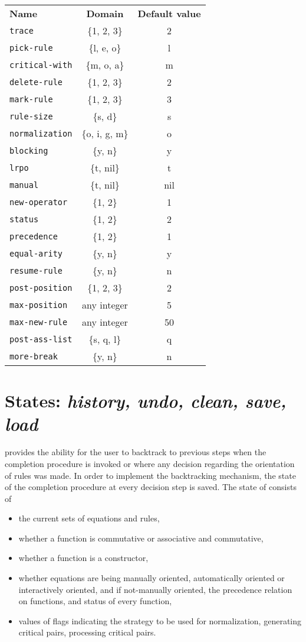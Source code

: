 \begin{tabular}{lcc}
{\bf Name} & {\bf Domain} & {\bf Default value} \\
{\tt trace} & \{1, 2, 3\} & 2 \\
{\tt pick-rule} & \{l, e, o\} & l \\
{\tt critical-with} & \{m, o, a\} & m \\
{\tt delete-rule} & \{1, 2, 3\} & 2 \\
{\tt mark-rule} & \{1, 2, 3\} & 3 \\
{\tt rule-size} & \{s, d\} & s \\
{\tt normalization} & \{o, i, g, m\} & o \\
{\tt blocking} & \{y, n\} & y \\
{\tt lrpo} & \{t, nil\} & t \\
{\tt manual} & \{t, nil\} & nil \\
{\tt new-operator} & \{1, 2\} & 1 \\
{\tt status} & \{1, 2\} & 2 \\
{\tt precedence} & \{1, 2\} & 1 \\
{\tt equal-arity} & \{y, n\} & y \\
{\tt resume-rule} & \{y, n\} & n \\
{\tt post-position} & \{1, 2, 3\} & 2 \\
{\tt max-position} & any integer & 5 \\
{\tt max-new-rule} & any integer & 50 \\
{\tt post-ass-list} & \{s, q, l\} & q \\
{\tt more-break} & \{y, n\} & n
\end{tabular}
\normalsize
\rm

\section{\RRL States:  {\em history, undo, clean, save, load}}

\RRL provides the ability for the user to backtrack to previous steps
when the completion procedure is invoked or
where any decision regarding the orientation of rules was made.  
In order to implement the backtracking mechanism, the
state of the completion procedure at every decision step is saved. The
state of \RRL consists of 
\begin{itemize}
\item the current sets of equations and rules,
\item whether a function is commutative or associative and commutative,
\item whether a function is a constructor, 
\item whether equations are being manually oriented, automatically
oriented or interactively oriented, and if not-manually oriented, the
precedence relation on functions, and status of every function, 
\item values of flags
indicating the strategy to be used for normalization, generating
critical pairs, processing critical pairs.
\end{itemize}

